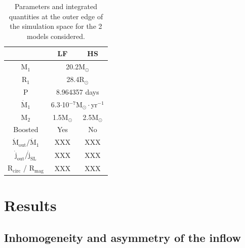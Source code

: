 \documentclass{aa}
\begin{document}
\begin{table}
\centering
\caption{Parameters and integrated quantities at the outer edge of the simulation space for the 2 models considered.}
\label{tab:params}
\begin{tabularx}{\linewidth}{c|c|c}
   & LF & HS \\
  \hline
  M$_1$ & \multicolumn{2}{c}{20.2M$_{\odot}$} \\
  R$_1$ & \multicolumn{2}{c}{28.4R$_{\odot}$} \\
  P & \multicolumn{2}{c}{8.964357 days} \\  
  $\dot{\text{M}}_1$ & \multicolumn{2}{c}{6.3$\cdot$10$^{-7}$M$_{\odot}\cdot$yr$^{-1}$} \\
  \hline
  M$_2$ & 1.5M$_{\odot}$  & 2.5M$_{\odot}$  \\
  Boosted & Yes & No  \\
  \hline
  $\dot{\text{M}}_{\text{out}}/\dot{\text{M}}_1$ & XXX & XXX  \\
  $\dot{\text{j}}_{\text{out}}/\dot{\text{j}}_{\text{SL}}$ & XXX & XXX \\
  R$_{\text{circ}}$ / R$_{\text{mag}}$ & XXX & XXX \\
\end{tabularx}
\end{table}


\section{Results}
\label{sec:res}

\subsection{Inhomogeneity and asymmetry of the inflow}
\label{sec:asymm}
\end{document}
